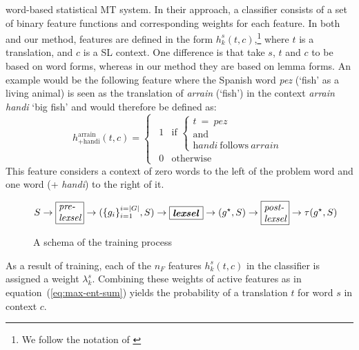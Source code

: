 \documentclass[11pt]{article}
\newcommand{\comment}[1]{\todo{#1}}
\begin{document}
word-based statistical MT system.
In their approach, a classifier consists of a set of binary feature
functions and corresponding weights for each feature.  In both
\cite{berger1996} and our method, features are defined in the form
$h_k^{s}(t, c)$,\footnote{We follow the notation of \cite{berger1996}} where $t$ is a translation, and $c$ is a SL
context. One difference is that \cite{berger1996} take $s$, $t$ and
$c$ to be based on word forms, whereas in our method they are based on
lemma forms.  An example would be the following feature where the
Spanish word \emph{pez} (`fish' as a living animal) is seen as the
translation of \emph{arrain} (`fish') in the context \emph{arrain
  handi} `big fish' and would therefore be defined as:
\begin{equation}
h_\mathrm{+handi}^{\mathrm{arrain}}(t, c) = \left \{ \begin{matrix}
                 ~~1 & \mbox{if } 
\left\{ \begin{array}{c}
t~ =~ \textit{pez}~ \\ \mathrm{and}~ \\ \textit{handi}~ \mathrm{follows}~ \textit{arrain} \end{array} \right. \\
                 ~~0 & \mbox{otherwise} \end{matrix} \right.
\label{eq:feat-func}
\end{equation}
This feature considers a context of zero words to the left of the
problem word and one word (+ \emph{handi}) to the right of it.

\begin{figure*}
\begin{displaymath}
  \label{eq:steps}
  S \to \mbox{\framebox{\parbox{0.8cm}{\textit{pre- lexsel}}}} \to (\{g_i\}_{i=1}^{i=|G|},S) \to \mbox{\framebox{\parbox{1.0cm}{\textit{\textbf{lexsel}}}}} \to (g^\star,S) \to \mbox{\framebox{\parbox{0.8cm}{\textit{post- lexsel}}}} \to \tau(g^\star,S)
\end{displaymath}
 \caption{A schema of the training process}
 \label{fig:lexselschema}
\end{figure*}


As a result of training, each of the \(n_F\) features \(h^s_k(t,c)\) in the classifier is assigned a
weight $\lambda_k^s$. Combining these weights of active features
as in equation~(\ref{eq:max-ent-sum}) yields the probability of a
translation $t$ for word $s$ in context $c$.
\end{document}
